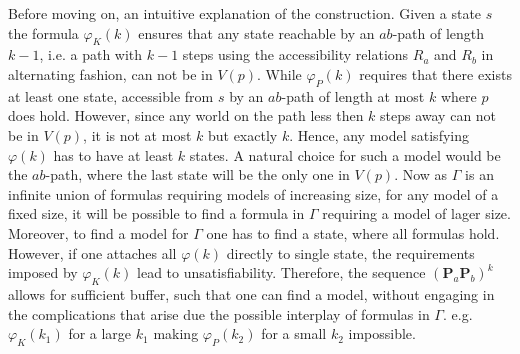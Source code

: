 \documentclass[11pt,a4paper]{article}
\newcommand{\esome}{\mathbf{P}}
\begin{document}
Before moving on, an intuitive explanation of the construction. Given a state $s$ the formula $\varphi_K(k)$ ensures that any state reachable by an $ab$-path of length $k-1$, i.e. a path with  $k-1$ steps using the accessibility relations $R_a$ and $R_b$ in alternating fashion, can not be in $V(p)$. While $\varphi_P(k)$ requires that there exists at least one state, accessible from $s$ by an $ab$-path of length at most $k$ where $p$ does hold. However, since any world on the path less then $k$ steps away can not be in $V(p)$, it is not at most $k$ but exactly $k$. Hence, any model satisfying $\varphi(k)$ has to have at least $k$ states. A natural choice for such a model would be the $ab$-path, where the last state will be the only one in $V(p)$. Now as $\Gamma$ is an infinite union of formulas requiring models of increasing size, for any model of a fixed size, it will be possible to find a formula in $\Gamma$ requiring a model of lager size. Moreover, to find a model for $\Gamma$ one has to find a state, where all formulas hold. However, if one attaches all $\varphi(k)$ directly to single state, the requirements imposed by $\varphi_K(k)$ lead to unsatisfiability. Therefore, the sequence $(\esome_a \esome_b)^k$ allows for sufficient buffer, such that one can find a model, without engaging in the complications that arise due the possible interplay of formulas in $\Gamma$. e.g. $\varphi_K(k_1)$ for a large $k_1$ making $\varphi_P(k_2)$ for a small $k_2$ impossible. \\
\end{document}
